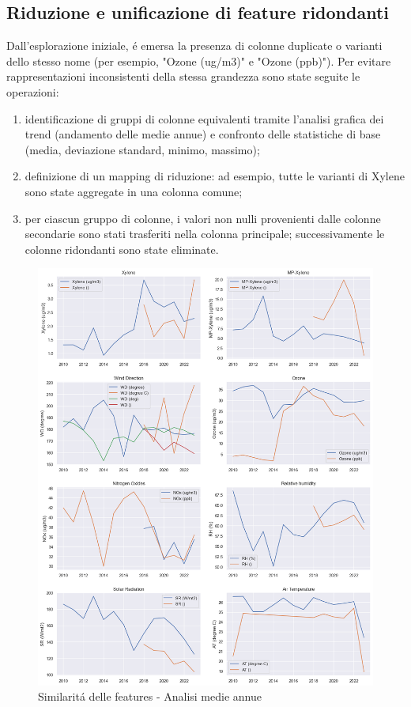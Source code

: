 \documentclass[a4paper,12pt]{report}
\begin{document}
	\subsection{Riduzione e unificazione di feature ridondanti}
	Dall'esplorazione iniziale, é emersa la presenza di colonne duplicate o varianti dello stesso nome (per esempio, "Ozone (ug/m3)" e "Ozone (ppb)"). Per evitare rappresentazioni inconsistenti della stessa grandezza sono state seguite le operazioni:
	\begin{enumerate}
		\item identificazione di gruppi di colonne equivalenti tramite l'analisi grafica dei trend (andamento delle medie annue) e confronto delle statistiche di base (media, deviazione standard, minimo, massimo);
		\item definizione di un mapping di riduzione: ad esempio, tutte le varianti di Xylene sono state aggregate in una colonna comune;
		\item per ciascun gruppo di colonne, i valori non nulli provenienti dalle colonne secondarie sono stati trasferiti nella colonna principale; successivamente le colonne ridondanti sono state eliminate.
	\end{enumerate}
	
	\begin{figure}[H]
		\centering
		\includegraphics[width=1.0\textwidth]{img/feat_red_pm.png}
		\caption{Similaritá delle features - Analisi medie annue}
	\end{figure}
	
\end{document}
